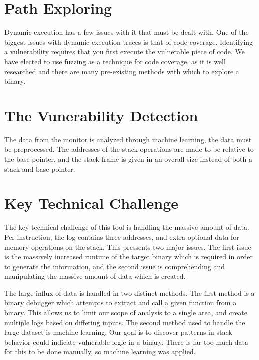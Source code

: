 \documentclass{article}
\begin{document}
\section {Path Exploring}
Dynamic execution has a few issues with it that must be dealt with. One of the
biggest issues with dynamic execution traces is that of code coverage.
Identifying a vulnerability requires that you first execute the vulnerable piece
of code. We have elected to use fuzzing as a technique for code coverage, as it
is well researched and there are many pre-existing methods with which to explore
a binary.

\section {The Vunerability Detection}
The data from the monitor is analyzed through machine learning, the data must be
preprocessed.  The addresses of the stack operations are made to be relative to
the base pointer, and the stack frame is given in an overall size instead of
both a stack and base pointer.

\section{Key Technical Challenge}

The key technical challenge of this tool is handling the massive amount of data.
Per instruction, the log contains three addresses, and extra optional data for
memory operations on the stack. This pressents two major issues. The first issue
is the massively increased runtime of the target binary which is required in
order to generate the information, and the second issue is comprehending and
manipulating the massive amount of data which is created.

The large influx of data is handled in two distinct methods. The first method is
a binary debugger which attempts to extract and call a given function from a
binary. This allows us to limit our scope of analysis to a single area, and
create multiple logs based on differing inputs. The second method used to handle
the large dataset is machine learning.  Our goal is to discover patterns in
stack behavior could indicate vulnerable logic in a binary.  There is far too
much data for this to be done manually, so machine learning was applied.
\end{document}
